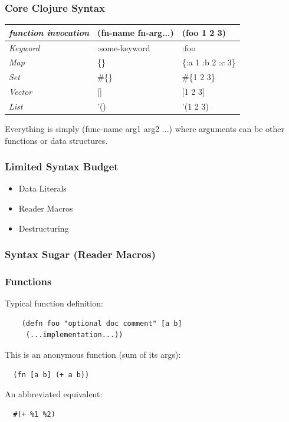 \documentclass{beamer}
\begin{document}
\begin{frame}
  \frametitle{Core Clojure Syntax}
  \begin{tabularx}{\textwidth}{ |X|X|X| }
    \hline
    \emph{function invocation} & (fn-name fn-arg...)  &  (foo 1 2 3) \\ 
    \hline
    \emph{Keyword} & :some-keyword  & :foo \\ 
    \hline
    \emph{Map} &    \{\}  & \{:a 1 :b 2 :c 3\} \\ 
    \hline
    \emph{Set} &    \#\{\} & \#\{1 2 3\} \\ 
    \hline
    \emph{Vector} & []  & [1 2 3] \\
    \hline
    \emph{List} & '() & '(1 2 3) \\
    \hline
  \end{tabularx}

  \vspace{.5cm}
  Everything is simply (func-name arg1 arg2 ...) where arguments can
  be other functions or data structures. 
\end{frame}

\begin{frame}
\frametitle{Limited Syntax Budget}
\begin{itemize}
  \item Data Literals 
  \item Reader Macros
  \item Destructuring
\end{itemize}
\end{frame}

\begin{frame}
\frametitle{Syntax Sugar (Reader Macros)}
%
%
\end{frame}

\begin{frame}[fragile]
  \frametitle{Functions}
  Typical function definition:
  \begin{verbatim}
    (defn foo "optional doc comment" [a b]
     (...implementation...))
  \end{verbatim}
  \vspace{1 cm}

  This is an anonymous function (sum of its args):
  \begin{verbatim}
  (fn [a b] (+ a b))   
  \end{verbatim}
  \vspace{1 cm}

  An abbreviated equivalent:
  \begin{verbatim}
  #(+ %1 %2)
  \end{verbatim}
\end{frame}
\end{document}
